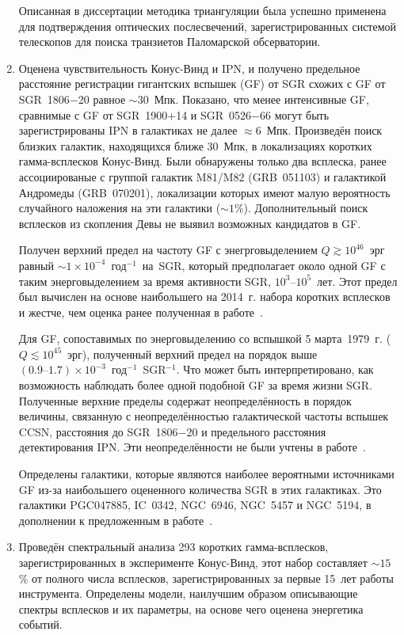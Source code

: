 \begin{enumerate}
    Описанная в диссертации методика триангуляции была успешно применена для 
    подтверждения оптических послесвечений, зарегистрированных системой телескопов 
    для поиска транзиетов Паломарской обсерватории.
    
\item Оценена чувствительность Конус-Винд и IPN, и получено 
    предельное расстояние регистрации гигантских вспышек (GF) от SGR схожих с GF от SGR~1806$-$20 
    равное $\sim 30$~Мпк. Показано, что менее интенсивные GF, сравнимые 
    с GF от SGR~1900+14 и SGR~0526$-$66 могут быть зарегистрированы IPN в галактиках 
    не далее $\approx 6$~Мпк.
    Произведён поиск близких галактик, находящихся ближе 30~Мпк, в локализациях 
    коротких гамма-всплесков Конус-Винд. Были обнаружены только два всплеска, ранее 
    ассоциированые с группой галактик M81/M82 (GRB~051103) и галактикой Андромеды (GRB~070201),
    локализации которых имеют малую вероятность случайного наложения на эти галактики ($\sim 1$\%).
    Дополнительный поиск всплесков из скопления Девы не выявил возможных кандидатов в GF.
    
    Получен верхний предел на частоту GF с энегрговыделением $Q \gtrsim 10^{46}$~эрг равный
    $\sim 1 \times 10^{-4}$~год$^{-1}$~на~SGR, который предполагает 
    около одной GF с таким энерговыделением за время активности SGR, $10^3\textrm{--}10^5$~лет. 
    Этот предел был вычислен на основе наибольшего на 2014~г.  
    набора коротких всплесков и жестче, чем оценка ранее полученная в работе~\citep{Ofek_2007ApJ}.
    
    Для GF, сопоставимых по энерговыделению со вспышкой 5 марта~1979~г. ($Q \lesssim 10^{45}$~эрг), 
    полученный верхний предел на порядок выше $(0.9\textrm{--}1.7)\times 10^{-3}$~год$^{-1}$~SGR$^{-1}$. 
    Что может быть интерпретировано, как возможность наблюдать более одной подобной GF за время жизни SGR.
    Полученные верхние пределы содержат неопределённость в порядок величины, связанную с
    неопределённостью галактической частоты вспышек CCSN, расстояния до SGR~1806$-$20 и
    предельного расстояния детектирования IPN. Эти неопределённости не были учтены в работе~\citep{Ofek_2007ApJ}.
    
    Определены галактики, которые являются наиболее вероятными источниками GF 
    из-за наибольшего оцененного количества SGR в этих галактиках. Это галактики
    PGC047885, IC~0342, NGC~6946, NGC~5457 и NGC~5194, в дополнении к предложенным 
    в работе~\citep{Popov2006}.
  
\item Проведён спектральный анализа 293 коротких гамма-всплесков,
    зарегистрированных в эксперименте Конус-Винд, этот набор составляет $\sim 15$\% 
    от полного числа всплесков, зарегистрированных за первые 15~лет работы инструмента.
    Определены модели, наилучшим образом описывающие спектры всплесков и их параметры,
    на основе чего оценена энергетика событий. 
    

\end{enumerate}
